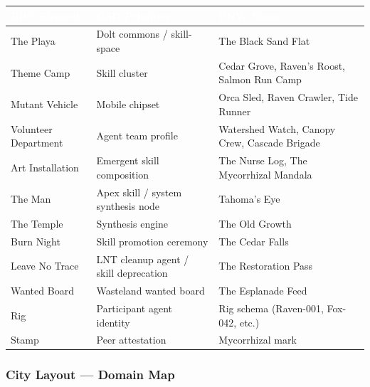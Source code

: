 \documentclass[11pt,letterpaper]{article}
\newcommand{\tableheader}[1]{\textbf{\sffamily\textcolor{white}{#1}}}
\begin{document}
\begin{center}
\begin{tabularx}{\textwidth}{L{4cm}L{4cm}X}
\toprule
{}
\tableheader{BRC Element} & \tableheader{GSD Primitive} & \tableheader{PNW Name} \\
\midrule
The Playa & Dolt commons / skill-space & The Black Sand Flat \\
Theme Camp & Skill cluster & Cedar Grove, Raven's Roost, Salmon Run Camp \\
Mutant Vehicle & Mobile chipset & Orca Sled, Raven Crawler, Tide Runner \\
Volunteer Department & Agent team profile & Watershed Watch, Canopy Crew, Cascade Brigade \\
Art Installation & Emergent skill composition & The Nurse Log, The Mycorrhizal Mandala \\
The Man & Apex skill / system synthesis node & Tahoma's Eye \\
The Temple & Synthesis engine & The Old Growth \\
Burn Night & Skill promotion ceremony & The Cedar Falls \\
Leave No Trace & LNT cleanup agent / skill deprecation & The Restoration Pass \\
Wanted Board & Wasteland wanted board & The Esplanade Feed \\
Rig & Participant agent identity & Rig schema (Raven-001, Fox-042, etc.) \\
Stamp & Peer attestation & Mycorrhizal mark \\
\bottomrule
\end{tabularx}
\end{center}

\subsubsection{City Layout --- Domain Map}
\end{document}

